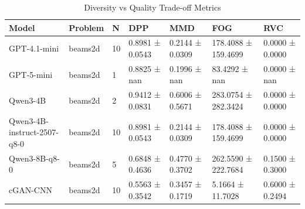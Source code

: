 \begin{table}
\caption{Diversity vs Quality Trade-off Metrics}
\label{tab:diversity_quality}
\begin{tabular}{lllllll}
\toprule
Model & Problem & N & DPP & MMD & FOG & RVC \\
\midrule
GPT-4.1-mini & beams2d & 10 & 0.8981 ± 0.0543 & 0.2144 ± 0.0309 & 178.4088 ± 159.4699 & 0.0000 ± 0.0000 \\
GPT-5-mini & beams2d & 1 & 0.8825 ± nan & 0.1996 ± nan & 83.4292 ± nan & 0.0000 ± nan \\
Qwen3-4B & beams2d & 2 & 0.9412 ± 0.0831 & 0.6006 ± 0.5671 & 283.0754 ± 282.3424 & 0.0000 ± 0.0000 \\
Qwen3-4B-instruct-2507-q8-0 & beams2d & 10 & 0.8981 ± 0.0543 & 0.2144 ± 0.0309 & 178.4088 ± 159.4699 & 0.0000 ± 0.0000 \\
Qwen3-8B-q8-0 & beams2d & 5 & 0.6848 ± 0.4636 & 0.4770 ± 0.3702 & 262.5590 ± 222.7684 & 0.1500 ± 0.3000 \\
cGAN-CNN & beams2d & 10 & 0.5563 ± 0.3542 & 0.3457 ± 0.1719 & 5.1664 ± 11.7028 & 0.6000 ± 0.2494 \\
\bottomrule
\end{tabular}
\end{table}
